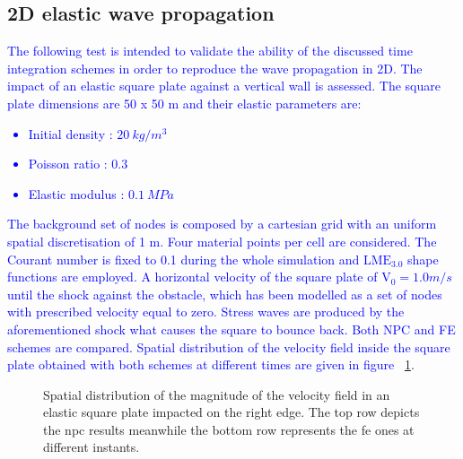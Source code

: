 \documentclass[preprint,12pt,a4paper]{elsarticle}
\begin{document}
\subsection{2D elastic wave propagation}
\label{sec:Velocity-waves-elastic-domain}

\textcolor{blue}{The following test is intended to validate the ability of the discussed time integration schemes in order to reproduce the wave propagation in 2D. The impact of an elastic square plate against a vertical wall is assessed. The square plate dimensions are 50 x 50 m and their elastic parameters are:
\begin{itemize} 
\item  Initial density : $20\ kg/m^3$
\item  Poisson ratio : $0.3$
\item  Elastic modulus : $0.1\ MPa$
\end{itemize}
}
\textcolor{blue}{The background set of nodes is composed by a cartesian grid with an uniform spatial discretisation of 1 m. Four material points per cell are considered. The Courant number is fixed to 0.1 during the whole simulation and $\text{LME}_{3.0}$ shape functions are employed. A horizontal velocity of the square plate of $\text{V}_0 = 1.0 m/s$ until the shock against the obstacle, which has been modelled as a set of nodes with prescribed velocity equal to zero. Stress waves are produced by the aforementioned shock what causes the square to bounce back. Both \acrshort{NPC} and \acrshort{FE} schemes are compared. Spatial distribution of the velocity field inside the square plate obtained with both schemes at different times are given in figure ~\ref{fig:Magnitude_velocity_impact_square}}. 
\begin{figure}
  \centering
  \caption{Spatial distribution of the magnitude of the velocity field in an elastic square plate impacted on the right edge. The top row depicts the \acrshort{npc} results meanwhile the bottom row represents the \acrshort{fe} ones at different instants.}
  \label{fig:Magnitude_velocity_impact_square}
\end{figure}
\end{document}
